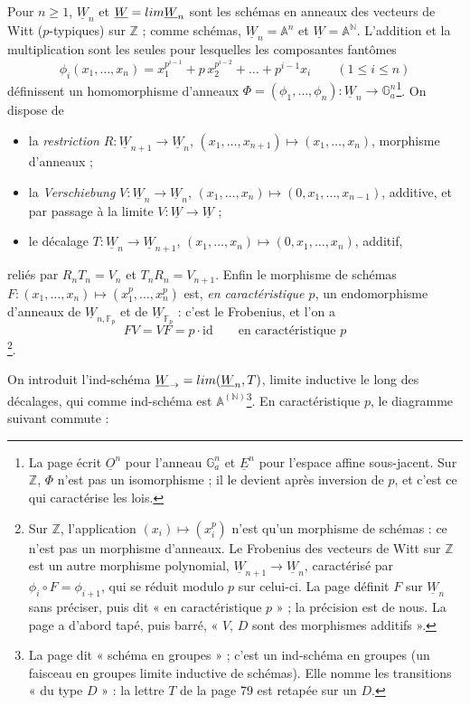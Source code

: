 \documentclass[11pt,a4paper]{article}
\begin{document}
Pour $n \geq 1$, $\underline{W}_n$ et $\underline{W} =
\varprojlim \underline{W}_n$ sont les schémas en anneaux des vecteurs de
Witt ($p$-typiques) sur $\mathbb{Z}$ ; comme schémas,
$\underline{W}_n = \mathbb{A}^{n}$ et $\underline{W} = \mathbb{A}^{\mathbb{N}}$.
L'addition et la multiplication sont les seules pour lesquelles les
composantes fantômes
\[
\phi_i(x_1, \dots, x_n) = x_1^{p^{i-1}} + p\, x_2^{p^{i-2}} + \dots
+ p^{i-1} x_i \qquad (1 \leq i \leq n)
\]
définissent un homomorphisme d'anneaux
$\Phi = (\phi_1, \dots, \phi_n) \colon \underline{W}_n \to
\mathbb{G}_a^{n}$\footnote{La page écrit $\underline{O}^{n}$ pour
l'anneau $\mathbb{G}_a^{n}$ et $\underline{E}^{n}$ pour l'espace affine
sous-jacent. Sur $\mathbb{Z}$, $\Phi$ n'est pas un isomorphisme ; il le
devient après inversion de $p$, et c'est ce qui caractérise les lois.}.
On dispose de
\begin{itemize}
  \item la \emph{restriction} $R \colon \underline{W}_{n+1} \to
  \underline{W}_n$, $(x_1, \dots, x_{n+1}) \mapsto (x_1, \dots, x_n)$,
  morphisme d'anneaux ;
  \item la \emph{Verschiebung} $V \colon \underline{W}_n \to
  \underline{W}_n$, $(x_1, \dots, x_n) \mapsto (0, x_1, \dots,
  x_{n-1})$, additive, et par passage à la limite $V \colon \underline{W}
  \to \underline{W}$ ;
  \item le décalage $T \colon \underline{W}_n \to \underline{W}_{n+1}$,
  $(x_1, \dots, x_n) \mapsto (0, x_1, \dots, x_n)$, additif,
\end{itemize}
reliés par $R_n T_n = V_n$ et $T_n R_n = V_{n+1}$. Enfin le morphisme de
schémas $F \colon (x_1, \dots, x_n) \mapsto (x_1^{p}, \dots, x_n^{p})$ est,
\emph{en caractéristique $p$}, un endomorphisme d'anneaux de
$\underline{W}_{n,\mathbb{F}_p}$ et de $\underline{W}_{\mathbb{F}_p}$ :
c'est le Frobenius, et l'on a
\[
FV = VF = p \cdot \mathrm{id} \qquad \text{en caractéristique } p
\]
\footnote{Sur $\mathbb{Z}$, l'application $(x_i) \mapsto (x_i^{p})$ n'est
qu'un morphisme de schémas : ce n'est pas un morphisme d'anneaux. Le
Frobenius des vecteurs de Witt sur $\mathbb{Z}$ est un autre morphisme
polynomial, $\underline{W}_{n+1} \to \underline{W}_n$, caractérisé par
$\phi_i \circ F = \phi_{i+1}$, qui se réduit modulo $p$ sur celui-ci. La
page définit $F$ sur $\underline{W}_n$ sans préciser, puis dit « en
caractéristique $p$ » ; la précision est de nous. La page a d'abord tapé,
puis barré, « $V$, $D$ sont des morphismes additifs ».}.

On introduit l'ind-schéma
$\underline{W}_{\to} = \varinjlim (\underline{W}_n, T)$, limite inductive
le long des décalages, qui comme ind-schéma est
$\mathbb{A}^{(\mathbb{N})}$\footnote{La page dit « schéma en groupes » ;
c'est un ind-schéma en groupes (un faisceau en groupes limite inductive de
schémas). Elle nomme les transitions « du type $D$ » : la lettre $T$ de la
page 79 est retapée sur un $D$.}. En caractéristique $p$, le diagramme
suivant commute :
\end{document}
